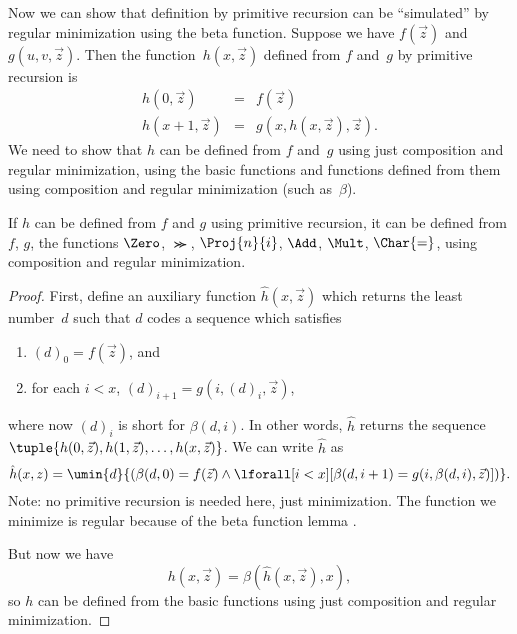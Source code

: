 \documentclass[../../../include/open-logic-section]{subfiles}
\begin{document}

Now we can show that definition by primitive recursion can be
``simulated'' by regular minimization using the beta function. Suppose
we have $f(\vec z)$ and $g(u,v,\vec z)$. Then the function~$h(x,\vec
z)$ defined from $f$ and~$g$ by primitive recursion is
\begin{eqnarray*}
h(0,\vec z) & = & f(\vec z) \\
h(x+1,\vec z) & = & g(x,h(x,\vec z),\vec z).
\end{eqnarray*}
We need to show that $h$ can be defined from $f$ and~$g$ using just
composition and regular minimization, using the basic functions and
functions defined from them using composition and regular minimization
(such as~$\beta$).

\begin{lem}
If $h$ can be defined from $f$ and $g$ using primitive recursion, it
can be defined from $f$, $g$, the functions $\Zero$, $\Succ$,
$\Proj{n}{i}$, $\Add$, $\Mult$, $\Char{=}$, using composition and
regular minimization.
\end{lem}

\begin{proof}
First, define an auxiliary function $\hat h(x,\vec z)$ which returns
the least number~$d$ such that $d$ codes a sequence which satisfies
\begin{enumerate}
\item $(d)_0 = f(\vec z)$, and
\item for each $i < x$, $(d)_{i+1} = g(i,(d)_i,\vec z)$,
\end{enumerate}
where now $(d)_i$ is short for $\beta(d,i)$. In other words, $\hat h$
returns the sequence $\tuple{h(0,\vec z), h(1,\vec z), \dots, h(x,\vec
  z)}$. We can write $\hat h$ as
\[
\hat h(x,z) = \umin{d}{(\beta(d,0) = f(\vec z) \land \lforall[i <
  x][\beta(d,i+1) = g(i,\beta(d,i),\vec z)])}.
\]
Note: no primitive recursion is needed here, just minimization. The
function we minimize is regular because of the beta function lemma
.

But now we have
\[
h(x,\vec z) = \beta(\hat h(x,\vec z),x),
\]
so $h$ can be defined from the basic functions using just composition
and regular minimization.
\end{proof}
\end{document}
